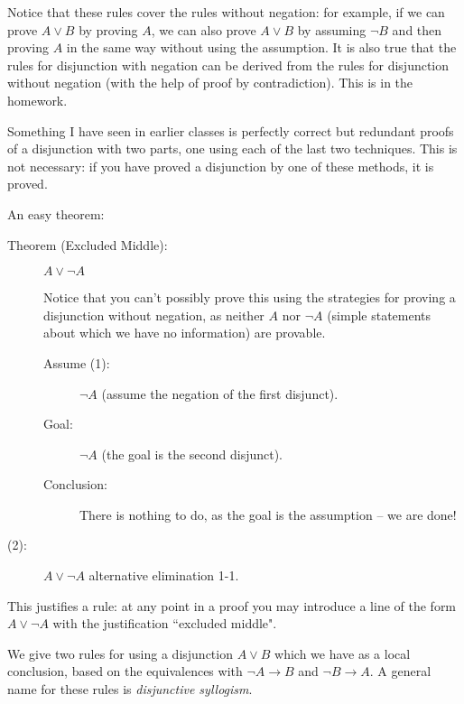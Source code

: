 \documentclass[12pt]{article}
\begin{document}
Notice that these rules cover the rules without negation:  for example, if we can prove $A \vee B$ by proving $A$, we can also prove $A \vee B$ by assuming $\neg B$ and then proving $A$ in the same way without using the assumption.  It is also true that the rules for disjunction with negation can be derived from the rules for disjunction without negation (with the help of proof by contradiction).  This is in the homework.

Something I have seen in earlier classes is perfectly correct but
redundant proofs of a disjunction with two parts, one using each of
the last two techniques.  This is not necessary: if you have proved a
disjunction by one of these methods, it is proved.

An easy theorem:

\begin{description}

\item[Theorem (Excluded Middle):]  $A \vee \neg A$

Notice that you can't possibly prove this using the strategies for proving a disjunction without negation, as neither $A$ nor $\neg A$ (simple statements about which we
have no information) are provable.

\begin{description}

\item[Assume (1):]  $\neg A$ (assume the negation of the first disjunct).

\item[Goal:]  $\neg A$  (the goal is the second disjunct).

\item[Conclusion:] There is nothing to do, as the goal is the
assumption -- we are done!



\end{description}

\item[(2):]  $A \vee \neg A$ alternative elimination 1-1.

\end{description}

This justifies a rule:  at any point in a proof you may introduce a line of the form $A \vee \neg A$ with the justification ``excluded middle".

We give two rules for using a disjunction $A \vee B$ which we have
as a local conclusion, based on the equivalences with $\neg A \rightarrow B$ and $\neg B \rightarrow A$.  A general name for these rules is {\em disjunctive syllogism\/}.
\end{document}
